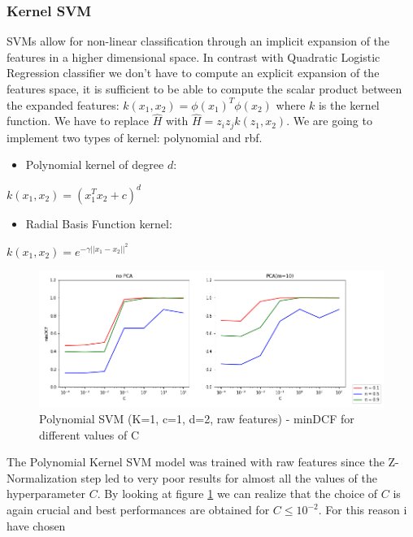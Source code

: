 \documentclass[10pt, a4paper, twocolumn]{article} %
\begin{document}
\subsubsection{Kernel SVM}
SVMs allow for non-linear classification through an implicit expansion of the features in a higher
dimensional space. In contrast with Quadratic Logistic Regression classifier we don't have to compute
an explicit expansion of the features space, it is sufficient to be able to compute the scalar product between
the expanded features: $k(x_1, x_2) = \phi(x_1)^T\phi(x_2)$ where $k$ is the kernel function. We have to 
replace $\hat{H}$ with $\hat{H} = z_iz_jk(z_1,x_2)$. We are going to implement two types of kernel: polynomial and rbf.
\begin{itemize}
	\item Polynomial kernel of degree $d$: 
\end{itemize}
		\begin{center}
			$k(x_1, x_2) = (x_1^Tx_2 + c)^d$
		\end{center}
\begin{itemize}
	\item Radial Basis Function kernel:
\end{itemize}
\begin{center}
	$k(x_1, x_2) = e^{-\gamma ||x_1 - x_2||^2}$
\end{center}
\begin{figure}[ht!]
	\includegraphics[width=\linewidth]{./Pictures/FeaturesAnalysis/polysvm.png}
	\caption{Polynomial SVM (K=1, c=1, d=2, raw features) - minDCF for different values of C}
	\label{polysvm} 
\end{figure}
The Polynomial Kernel SVM model was trained with raw features since the Z-Normalization step led to very poor results
for almost all the values of the hyperparameter $C$. 
By looking at figure \ref{polysvm} we can realize that the choice of $C$ is again
crucial and best performances are obtained for $C \le10^{-2}$. For this reason i have chosen 
\end{document}
